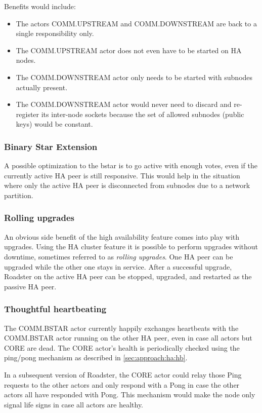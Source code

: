 Benefits would include:
\begin{itemize}
\item The actors COMM.UPSTREAM and COMM.DOWNSTREAM are back to a single responsibility only.
\item The COMM.UPSTREAM actor does not even have to be started on HA nodes.
\item The COMM.DOWNSTREAM actor only needs to be started with subnodes actually present.
\item The COMM.DOWNSTREAM actor would never need to discard and re-register its inter-node sockets because the set of allowed subnodes (public keys) would be constant.
\end{itemize}

\subsubsection{Binary Star Extension}
A possible optimization to the \gls{bstar} is to go active with enough votes,
even if the currently active HA peer is still responsive. This would help in
the situation where only the active HA peer is disconnected from subnodes due
to a network partition.

\subsubsection{Rolling upgrades}
An obvious side benefit of the high availability feature comes into play with
upgrades. Using the HA cluster feature it is possible to perform upgrades
without downtime, sometimes referred to as \emph{rolling upgrades}.  One HA
peer can be upgraded while the other one stays in service. After a successful
upgrade, Roadster on the active HA peer can be stopped, upgraded, and restarted
as the passive HA peer.


\subsubsection{Thoughtful heartbeating}\label{sec:discussion:imp:ha:hb}
The COMM.BSTAR actor currently happily exchanges heartbeats with the COMM.BSTAR actor
running on the other HA peer, even in case all actors but CORE are dead. The
CORE actor's health is periodically checked using the ping/pong mechanism as
described in \autoref{sec:approach:ha:hb}.

In a subsequent version of Roadster, the CORE actor could relay those Ping
requests to the other actors and only respond with a Pong in case the other
actors all have responded with Pong. This mechanism would make the node only
signal life signs in case all actors are healthy.

